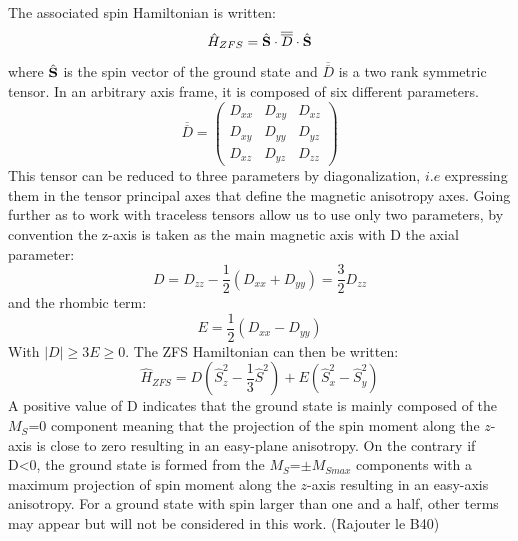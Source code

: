 \documentclass[10pt]{report}
\numberwithin{equation}{section}
\begin{document}
The associated spin Hamiltonian is written:
\begin{equation}\label{SDS}
    \hat{H}_{ZFS}=\hat{\vb S} \cdot \overline{\overline{D}} \cdot \hat{\vb S}
\end{equation}
where $\hat{\vb S}$ is the spin vector of the ground state and $\overline{\overline{D}}$ is a two rank symmetric tensor. In an arbitrary axis frame, it is composed of six different parameters.
\begin{equation}
    \overline{\overline{D}}=\begin{pmatrix}
        D_{xx} & D_{xy} & D_{xz}\\
        D_{xy} & D_{yy} & D_{yz}\\
        D_{xz} & D_{yz} & D_{zz}
    \end{pmatrix}
\end{equation}
This tensor can be reduced to three parameters by diagonalization, $\textit{i.e}$ expressing them in the tensor principal axes that define the magnetic anisotropy axes.
Going further as to work with traceless tensors allow us to use only two parameters, by convention the z-axis is taken as the main magnetic axis with D the axial parameter:
\begin{equation}\label{ParametreD}
    D=D_{zz}-\frac{1}{2}(D_{xx}+D_{yy})=\frac{3}{2}D_{zz}
\end{equation}
and the rhombic term:
\begin{equation}\label{ParametreE}
    E=\frac{1}{2}(D_{xx}-D_{yy})
\end{equation}
With $|D| \geq 3E \geq 0$. 
The ZFS Hamiltonian can then be written:
\begin{equation}  %
    \hat{H}_{ZFS}=D (\hat{S}_z^2-\frac{1}{3}\hat{S}^2)+E(\hat{S}_x^2-\hat{S}_y^2)
\end{equation}
A positive value of D indicates that the ground state is mainly composed of the $M_S$=0 component meaning that the projection of the spin moment along the $z$-axis is close to zero resulting in an easy-plane anisotropy. 
On the contrary if D<0, the ground state is formed from the $M_S$=$\pm M_{Smax}$ components with a maximum projection of spin moment along the $z$-axis resulting in an easy-axis anisotropy.
For a ground state with spin larger than one and a half, other terms may appear but will not be considered in this work. (Rajouter le B40)
\end{document}
